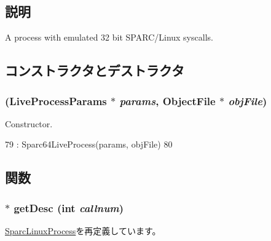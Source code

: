 \subsection{説明}
A process with emulated 32 bit SPARC/Linux syscalls. 

\subsection{コンストラクタとデストラクタ}
\hypertarget{classSparcISA_1_1Sparc64LinuxProcess_a793e03fda97beecb28b9dd17ef791f15}{
\subsubsection[{Sparc64LinuxProcess}]{ (LiveProcessParams $\ast$ {\em params}, \/  {\bf ObjectFile} $\ast$ {\em objFile})}}
\label{classSparcISA_1_1Sparc64LinuxProcess_a793e03fda97beecb28b9dd17ef791f15}


Constructor. 


\begin{DoxyCode}
79     : Sparc64LiveProcess(params, objFile)
80 {}
\end{DoxyCode}


\subsection{関数}
\hypertarget{classSparcISA_1_1Sparc64LinuxProcess_a85e8ccf0c435d95c14574f0a217f5116}{
\subsubsection[{getDesc}]{$\ast$ getDesc (int {\em callnum})}}
\label{classSparcISA_1_1Sparc64LinuxProcess_a85e8ccf0c435d95c14574f0a217f5116}


\hyperlink{classSparcISA_1_1SparcLinuxProcess_aebbff609a7235342925445690acf5ee8}{SparcLinuxProcess}を再定義しています。


